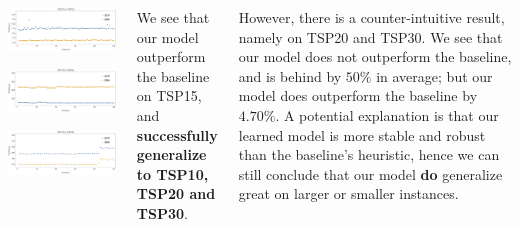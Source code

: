 \documentclass[20pt,,margin=1in,innermargin=-4.5in,blockverticalspace=-0.25in]{tikzposter}
\begin{document}
\begin{columns}
{\begin{center}
\begin{minipage}{0.49\linewidth}
				\begin{tikzfigure}
					\includegraphics[width=13cm]{Figures/result/15-20.png}
				\end{tikzfigure}%
			\end{minipage}\hfill
			\begin{minipage}{0.49\linewidth}
				\centering
				\begin{tikzfigure}
					\includegraphics[width=13cm]{Figures/result/15-25.png}
				\end{tikzfigure}%
			\end{minipage}
			\includegraphics[width=27cm]{Figures/result/15-30(from15-15).png}
		\end{center}
		We see that our model outperform the baseline on TSP15, and \textbf{successfully generalize to TSP10, TSP20
			and TSP30}.

		However, there is a counter-intuitive result, namely on TSP20 and TSP30. We see that our model does not
		outperform the baseline, and is behind by \(50\%\) in average; but our model does outperform the baseline
		by \(4.70\%\). A potential explanation is that our learned model is more stable and robust than the
		baseline's heuristic, hence we can still conclude that our model \textbf{do} generalize great on larger
		or smaller instances.
	}


\end{columns}
\end{document}
